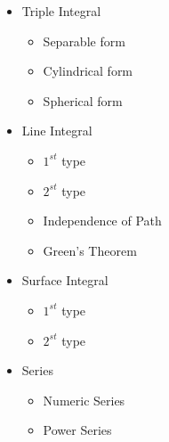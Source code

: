 \begin{minipage}{\columnwidth}
   \begin{itemize}
      \item Triple Integral
        \begin{itemize}
          \item Separable form
          \item Cylindrical form
          \item Spherical form
        \end{itemize}
      \item Line Integral
        \begin{itemize}
          \item $1^{st}$ type
          \item $2^{st}$ type
          \item Independence of Path
          \item Green's Theorem
        \end{itemize}
      \item Surface Integral
        \begin{itemize}
          \item $1^{st}$ type
          \item $2^{st}$ type
        \end{itemize}
      \item Series
        \begin{itemize}
          \item Numeric Series
          \item Power Series
        \end{itemize}
    \end{itemize}
\end{minipage}